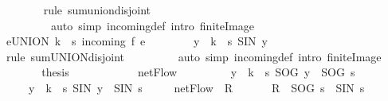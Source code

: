 \begin{isabellebody}
\ \ \ \ \ \ \isamarkupfalse%
\ {\isacharparenleft}rule\ sum{\isachardot}union{\isacharunderscore}disjoint{\isacharparenright}\ \isanewline
\ \ \ \ \ \ \ \ \ {\isacharparenleft}auto\ simp{\isacharcolon}\ incoming{\isacharunderscore}def\ intro{\isacharcolon}\ finite{\isacharunderscore}Image{\isacharparenright}\isanewline
\ \ \ \ \isamarkupfalse%
\ \isamarkupfalse%
\ {\isachardoublequoteopen}{\isacharparenleft}{\isasymSum}e{\isasymin}{\isacharparenleft}UNION\ {\isacharparenleft}k\ {\isacharminus}\ {\isacharbraceleft}s{\isacharbraceright}{\isacharparenright}\ incoming{\isacharparenright}{\isachardot}\ f\ e{\isacharparenright}\ \isanewline
\ \ \ \ \ \ {\isacharequal}\ {\isacharparenleft}{\isasymSum}y\ {\isasymin}\ k\ {\isacharminus}\ {\isacharbraceleft}s{\isacharbraceright}{\isachardot}\ {\isacharquery}SIN\ y{\isacharparenright}{\isachardoublequoteclose}\isanewline
\ \ \ \ \ \ \isamarkupfalse%
\ {\isacharparenleft}rule\ sum{\isachardot}UNION{\isacharunderscore}disjoint{\isacharparenright}\isanewline
\ \ \ \ \ \ \ \ \ {\isacharparenleft}auto\ simp{\isacharcolon}\ incoming{\isacharunderscore}def\ intro{\isacharcolon}\ finite{\isacharunderscore}Image{\isacharparenright}\isanewline
\ \ \ \ \isamarkupfalse%
\ \isamarkupfalse%
\ {\isacharquery}thesis\ \isacommand{{\isachardot}}\isamarkupfalse%
\isanewline
\ \ \isamarkupfalse%
\ \ \isanewline
\ \ \isamarkupfalse%
\ \isamarkupfalse%
\ {\isachardoublequoteopen}netFlow\ {\isacharequal}\ \ \isanewline
\ \ \ \ \ \ {\isacharparenleft}{\isacharparenleft}{\isasymSum}y\ {\isasymin}\ k\ {\isacharminus}\ {\isacharbraceleft}s{\isacharbraceright}{\isachardot}\ {\isacharquery}SOG\ y{\isacharparenright}\ {\isacharplus}\ {\isacharquery}SOG\ s{\isacharparenright}\ \isanewline
\ \ \ \ {\isacharminus}\ {\isacharparenleft}{\isacharparenleft}{\isasymSum}y\ {\isasymin}\ k\ {\isacharminus}\ {\isacharbraceleft}s{\isacharbraceright}{\isachardot}\ {\isacharquery}SIN\ y{\isacharparenright}\ {\isacharplus}\ {\isacharquery}SIN\ s{\isacharparenright}{\isachardoublequoteclose}\isanewline
\ \ \ \ {\isacharparenleft}\ {\isachardoublequoteopen}netFlow\ {\isacharequal}\ {\isacharquery}R{\isachardoublequoteclose}{\isacharparenright}\ \isacommand{{\isachardot}}\isamarkupfalse%
\isanewline
\ \ \isamarkupfalse%
\ \isamarkupfalse%
\ {\isachardoublequoteopen}{\isacharquery}R\ {\isacharequal}\ {\isacharquery}SOG\ s\ {\isacharminus}\ {\isacharquery}SIN\ s{\isachardoublequoteclose}\isanewline

\end{isabellebody}
